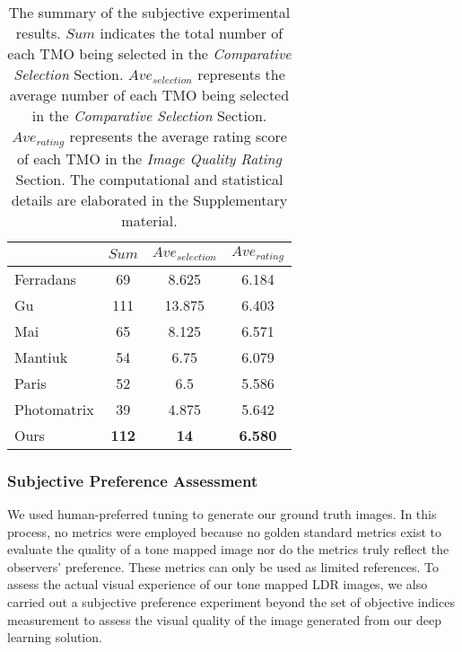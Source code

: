\documentclass[journal]{IEEEtran}
\begin{document}
\begin{table}[tb]
\footnotesize
\begin{center}
\caption{The summary of the subjective experimental results. $Sum$ indicates the total number of each TMO being selected in the \textit{Comparative Selection} Section.  $Ave_{selection}$ represents the average number of each TMO being selected in the \textit{Comparative Selection} Section.  $Ave_{rating}$ represents the average rating score of each TMO in the \textit{Image Quality Rating} Section.  The computational and statistical details are elaborated in the Supplementary material.}
\begin{tabular}{l|c|c|c}\hline
 & $Sum$ & $Ave_{selection}$ & $Ave_{rating}$ \\ \hline
Ferradans \cite{ferradans2011analysis} & 69 & 8.625 & 6.184 \\ \hline
Gu \cite{gu2013local} & 111 & 13.875 & 6.403 \\ \hline
Mai \cite{mai2011optimizing} & 65 & 8.125 & 6.571 \\ \hline
Mantiuk \cite{mantiuk2008display} & 54 & 6.75 & 6.079 \\ \hline
Paris \cite{paris2015local} & 52 & 6.5 & 5.586 \\ \hline
Photomatrix \cite{photomatrix} & 39 & 4.875 & 5.642 \\ \hline
Ours & \textbf{112} & \textbf{14} & \textbf{6.580} \\ \hline

\end{tabular}
\label{table:subjective_survey}
\end{center}
\end{table}


\subsubsection{Subjective Preference Assessment} 
We used human-preferred tuning to generate our ground truth images. In this process, no metrics were employed because no golden standard metrics exist to evaluate the quality of a tone mapped image nor do the metrics truly reflect the observers' preference. These metrics can only be used as limited references. To assess the actual visual experience of our tone mapped LDR images, we also carried out a subjective preference experiment beyond the set of objective indices measurement to assess the visual quality of the image generated from our deep learning solution. 
\end{document}
